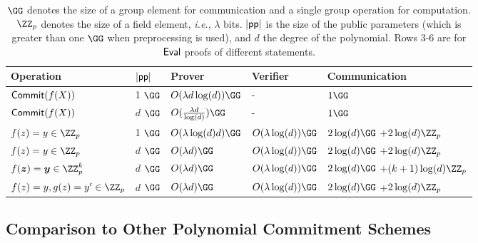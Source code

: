 \begin{table}[!htp]
\begin{small}
\begin{tabular}{l|l||l|l|l}
	Operation & $|\textsf{pp}|$  & Prover & Verifier & Communication\\
	\hline
    $\textsf{{Commit}}(f(X))$ & 1 $\GG$ & $O(\lambda d\log(d))\GG$ & - & $1 \GG$\\
    $\textsf{{Commit}}(f(X))$ & $d$ $\GG$ & $O(\frac{\lambda d}{\log(d)}) \GG$ & - & $1 \GG$\\
    $f(z)=y\in \ZZ_p$  & 1 $\GG$ & $O(\lambda  \log(d) d)\GG$ & $O(\lambda \log(d))\GG$ & $2 \log(d) \GG$ +$2 \log(d) \ZZ_p$ \\
      $f(z)=y\in \ZZ_p$  & $d$ $\GG$ & $O(\lambda d)\GG$ & $O(\lambda \log(d))\GG$ & $2 \log(d) \GG$ +$2 \log(d) \ZZ_p$ \\
       $f(\boldsymbol{z})=\boldsymbol{y}\in \ZZ^k_p$  & $d$ $\GG$ & $O(\lambda d)\GG$ & $O(\lambda \log(d))\GG$ & $2 \log(d) \GG$ +$(k+1) \log(d) \ZZ_p$ \\
                $f(z)=y, g(z)=y'\in \ZZ_p$  & $d$ $\GG$ & $O(\lambda d)\GG$ & $O(\lambda \log(d))\GG$ & $2 \log(d) \GG$ +$2 \log(d) \ZZ_p$ \\

\end{tabular}

\caption{$\GG$ denotes the size of a group element for communication and a single group operation for computation. $\ZZ_p$ denotes the size of a field element, \emph{i.e.}, $\lambda$ bits. $|\textsf{pp}|$ is the size of the public parameters (which is greater than one $\GG$ when preprocessing is used), and $d$ the degree of the polynomial. Rows 3-6 are for $\textsf{{Eval}}$ proofs of different statements.}
\label{tab:performance}
\end{small}
\end{table}

\subsection{Comparison to Other Polynomial Commitment Schemes}

